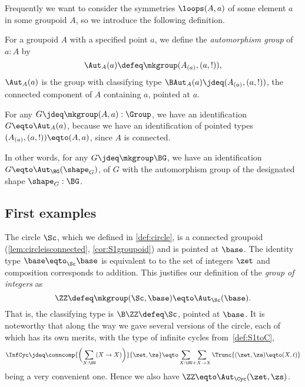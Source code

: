 Frequently we want to consider the symmetries $\loops(A,a)$ of some element $a$ in some groupoid $A$, so we introduce the following definition.

\begin{definition}\label{def:automorphism-group}
  For a groupoid $A$ with a specified point $a$,
  we define the \emph{automorphism group} of $a:A$ by
  \[
    \Aut_A(a) \defeq \mkgroup (A_{(a)},(a,!)),
  \]
  \ie $\Aut_A(a)$ is the group with classifying type
  $\BAut_A(a) \jdeq (A_{(a)},(a,!))$,
  the connected component of $A$ containing $a$, pointed at $a$.
\end{definition}
\begin{remark}
  \label{rem:symmetriesofnonconnectedgroupoids}
  For any $G \jdeq \mkgroup(A,a) : \Group$, we have an identification
  $G \eqto \Aut_A(a)$,
  because we have an identification of pointed types $(A_{(a)},(a,!)) \eqto (A,a)$,
  since $A$ is connected.

  In other words, for any $G \jdeq \mkgroup\BG$, we have
  an identification $G \eqto \Aut_{\BG}(\shape_G)$, of $G$ with the automorphism
  group of the designated shape $\shape_G : \BG$.
\end{remark}

\subsection{First examples}
\label{sec:firstgroupexamples}
\begin{example}\label{ex:circlegroup}
  The circle $\Sc$, which we defined in \cref{def:circle},
  is a connected groupoid (\cref{lem:circleisconnected}, \cref{cor:S1groupoid})
  and is pointed at $\base$.
  The identity type $\base\eqto_\Sc\base$ is equivalent to to the set of integers $\zet$
  and composition corresponds to addition.
  This justifies our definition of the \emph{group of integers} as
  \[
    \ZZ \defeq \mkgroup(\Sc,\base) \eqto \Aut_\Sc(\base).
  \]
  That is, the classifying type is $\B\ZZ \defeq \Sc$, pointed at $\base$.
  It is noteworthy that along the way we gave several versions of the circle,
  each of which has its own merits,
  with the type of infinite cycles from~\cref{def:S1toC},
  \[
    \InfCyc\jdeq\conncomp{\biggl(\sum_{X:\UU}(X\to X)\biggr)}{\zet,\zs}
    \eqto \sum_{X:\UU} \sum_{t:X\to X} \Trunc{(\zet,\zs)\eqto(X,t)}
  \]
  being a very convenient one.
  Hence we also have $\ZZ \eqto \Aut_\Cyc(\zet,\zs)$.
\end{example}

